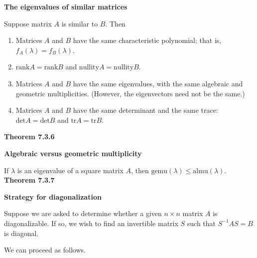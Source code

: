 \par\noindent\textbf{The eigenvalues of similar matrices}
\par\noindent Suppose matrix $A$ is similar to $B$. Then
\renewcommand{\labelenumi}{\textbf{\alph{enumi}.}}
\begin{enumerate}
\item Matrices $A$ and $B$ have the same characteristic polynomial; that is, $f_{A}(\lambda)=f_{B}(\lambda{})$.
\item $\textrm{rank}A=\textrm{rank}B$ and $\textrm{nullity}A=\textrm{nullity}B$.
\item Matrices $A$ and $B$ have the same eigenvalues, with the same algebraic and geometric multiplicities. (However, the eigenvectors need not be the same.)
\item Matrices $A$ and $B$ have the same determinant and the same trace: $\textrm{det}A=\textrm{det}B$ and $\textrm{tr}A=\textrm{tr}B$.
\end{enumerate}
\textbf{Theorem 7.3.6}\\
\par\noindent\textbf{Algebraic versus geometric multiplicity}
\par\noindent If $\lambda{}$ is an eigenvalue of a square matrix $A$, then $\textrm{gemu}(\lambda{})\le{}\textrm{almu}(\lambda{})$.
\textbf{Theorem 7.3.7}\\
\par\noindent\textbf{Strategy for diagonalization}
\par\noindent Suppose we are asked to determine whether a given $n\times{}n$ matrix $A$ is diagonalizable. If so, we wish to find an invertible matrix $S$ such that $S^{-1}AS=B$ is diagonal.
\par We can proceed as follows.
\renewcommand{\labelenumi}{\textbf{\alph{enumi}.}}

